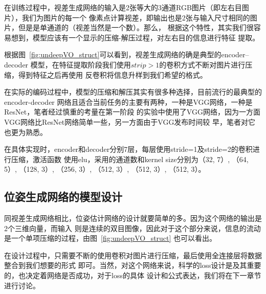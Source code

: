 在训练过程中，视差生成网络的输入是2张等大的3通道RGB图片（即左右目图片），我们为图片的每一个
像素点计算视差，即输出也是2张与输入尺寸相同的图片，但是是单通道的（视差当然是一个数）。那么，
根据这个特性，其实我们很容易想到，模型应该有一个显示的压缩-解压过程，对左右目的信息进行特征
提取。

根据图~\ref{fig:undeepVO_struct}可以看到，视差生成网络的确是典型的encoder--decoder
模型，在特征提取阶段我们使用$strip > 1$的卷积方式不断对图片进行压缩，得到特征之后再使用
反卷积将信息升样到我们希望的格式。

在实际的编码过程中，模型的压缩和解压其实有很多种选择，目前流行的最典型的encoder-decoder
网络且适合当前任务的主要有两种，一种是VGG\cite{simonyan2014very}网络，一种是
ResNet\cite{he2016deep}，笔者经过慎重的考量在第一阶段
的实验中使用了VGG网络，因为一方面VGG网络比ResNet网络简单一些，另一方面由于VGG发布时间较
早，笔者对它也更为熟悉。

在具体实现时，encoder和decoder分别7层，每层使用stride=1及stride=2的卷积进行压缩，激活函数
使用elu，采用的通道数和kernel size分别为（32, 7）, （64, 5）, （128, 3）, （256, 3）,
（512, 3）, （512, 3）, （512, 3）。

\subsection{位姿生成网络的模型设计}

同视差生成网络相比，位姿估计网络的设计就要简单的多。因为这个网络的输出是2个三维向量，而输入
则是连续的双目图像，因此对于这个部分来说，信息的流动是一个单项压缩的过程，由图~\ref{fig:undeepVO_struct}
也可以看出。

在设计过程中，只需要不断的使用卷积对图片进行压缩，最后使用全连接层将数据整合到我们想要的形式
即可。当然，对这个网络来说，科学的loss设计是及其重要的，也决定着网络是否成功，对于loss的具体
设计和公式表达，我们将在下一章节进行讨论。



